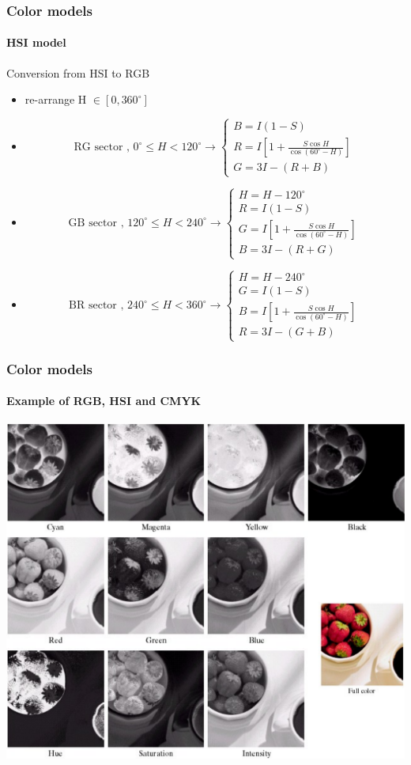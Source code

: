 \documentclass{beamer}
\begin{document}
\begin{frame}
\frametitle{Color models}
\framesubtitle{HSI model}
\begin{block}{Conversion from HSI to RGB}
\scriptsize{
\begin{itemize}
\item re-arrange H $\in [0, 360^{\circ}]$ 
\item[]
\[\text{RG sector  , } 
0^{\circ} \leq H < 120^{\circ} \rightarrow
\begin{cases}
B = I(1-S)\\
R =  I[1+\frac{S\cos H}{\cos(60^{\circ}-H)}]\\
G = 3I - (R+B)
\end{cases}
\]
\item[]
\[ \text{GB sector  , } 
120^{\circ} \leq H < 240^{\circ} \rightarrow
\begin{cases}
H = H - 120^{\circ}\\
R = I(1-S)\\
G =  I[1+\frac{S\cos H}{\cos(60^{\circ}-H)}]\\
B = 3I - (R+G)
\end{cases}
\]
\item[]
\[ \text{BR sector  , } 
240^{\circ} \leq H < 360^{\circ} \rightarrow
\begin{cases}
H = H - 240^{\circ}\\
G = I(1-S)\\
B =  I[1+\frac{S\cos H}{\cos(60^{\circ}-H)}]\\
R = 3I - (G+B)
\end{cases}
\]
\end{itemize}}
\end{block}
\end{frame}
\begin{frame}
\frametitle{Color models}
\framesubtitle{Example of RGB, HSI and CMYK}
\begin{center}
\includegraphics[scale= 0.27]{images/L6_ex_RGBCYMHSI.png}
\end{center}
\end{frame}
\end{document}
